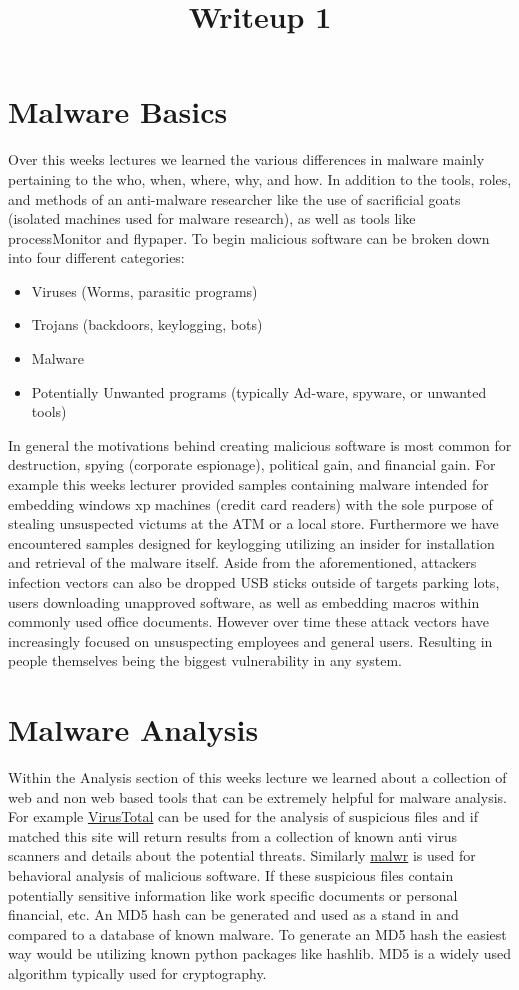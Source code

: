 \documentclass[letterpaper,12pt,titlepage,onecolumn]{IEEEtran}
\author{\name}
\title{Writeup 1}
\begin{document}
\maketitle
\hrulefill

\section{Malware Basics}
Over this weeks lectures we learned the various differences in malware mainly pertaining to the who, when, where, why, and how. 
In addition to the tools, roles, and methods of an anti-malware researcher like the use of sacrificial goats (isolated machines used for malware research), as well as tools like processMonitor and flypaper.
To begin malicious software can be broken down into four different categories:
\begin{itemize}
    \item Viruses (Worms, parasitic programs)
    \item Trojans (backdoors, keylogging, bots)
    \item Malware
    \item Potentially Unwanted programs (typically Ad-ware, spyware, or unwanted tools)
\end{itemize}
 In general the motivations behind creating malicious software is most common for destruction, spying (corporate espionage), political gain, and financial gain.
 For example this weeks lecturer provided samples containing malware intended for embedding windows xp machines (credit card readers) with the sole purpose of stealing unsuspected victums at the ATM or a local store.
 Furthermore we have encountered samples designed for keylogging utilizing an insider for installation and retrieval of the malware itself.
 Aside from the aforementioned, attackers infection vectors can also be dropped USB sticks outside of targets parking lots, users downloading unapproved software, as well as embedding macros within commonly used office documents. However over time these attack vectors have increasingly focused on unsuspecting employees and general users. Resulting in people themselves being the biggest vulnerability in any system.
 

\section{Malware Analysis}
Within the Analysis section of this weeks lecture we learned about a collection of web and non web based tools that can be extremely helpful for malware analysis.
For example \href{www.VirusTotal.com}{VirusTotal} can be used for the analysis of suspicious files and if matched this site will return results from a collection of known anti virus scanners and details about the potential threats.
Similarly \href{www.malwr.com}{malwr} is used for behavioral analysis of malicious software.
If these suspicious files contain potentially sensitive information like work specific documents or personal financial, etc. An MD5 hash can be generated and used as a stand in and compared to a database of known malware.
To generate an MD5 hash the easiest way would be utilizing known python packages like hashlib. MD5 is a widely used algorithm typically used for cryptography.
\end{document}
